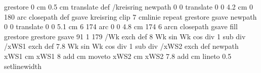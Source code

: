 {{{                     grestore
                      0 cm 0.5 cm translate
                   } def
/kreisring { newpath
                      0 0 translate
                      0 0 4.2 cm 0 180 arc
                     closepath
                    } def
               gsave
                        kreisring clip
                        7 {cmlinie} repeat
              grestore
   gsave
                 newpath
                      0 0 translate
                      0 0 5.1 cm 6 174 arc
                      0 0 4.8 cm 174 6 arcn
                 closepath
                   gsave
                    \pst@usecolor\ProLineCol
        \tx@setTransparency fill 
                 grestore
   grestore
 gsave
   91 1 179 { /Wk exch def %
                       {8 Wk sin Wk cos div 1 sub div} /xWS1 exch def %
                       {7.8 Wk sin Wk cos div 1 sub div} /xWS2 exch def %
                        newpath
                        xWS1 cm xWS1 8 add cm moveto %
                        xWS2 cm xWS2 7.8 add cm %
                       lineto
                       0.5 setlinewidth
}}}
